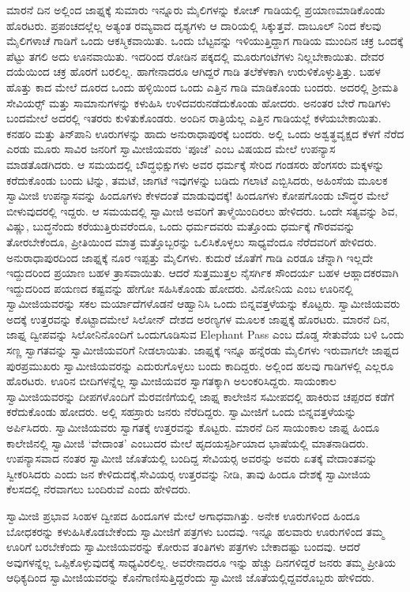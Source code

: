 \vskip 3pt

 ಮಾರನೆ ದಿನ ಅಲ್ಲಿಂದ ಜಾಫ್ನಕ್ಕೆ ಸುಮಾರು ಇನ್ನೂರು ಮೈಲಿಗಳನ್ನು ಕೋಚ್ ಗಾಡಿಯಲ್ಲಿ ಪ್ರಯಾಣಮಾಡಿಕೊಂಡು ಹೊರಟರು. ಪ್ರಪಂಚದಲ್ಲೆಲ್ಲ ಅತ್ಯಂತ ರಮ್ಯವಾದ ದೃಶ್ಯಗಳು ಆ ದಾರಿಯಲ್ಲಿ ಸಿಕ್ಕುತ್ತವೆ. ದಾಬೂಲ್ ನಿಂದ ಕೆಲವು ಮೈಲಿಗಳಾಚೆ ಗಾಡಿಗೆ ಒಂದು ಆಕಸ್ಮಿಕವಾಯಿತು. ಒಂದು ಬೆಟ್ಟವನ್ನು ಇಳಿಯುತ್ತಿದ್ದಾಗ ಗಾಡಿಯ ಮುಂದಿನ ಚಕ್ರ ಒಂದಕ್ಕೆ ಪೆಟ್ಟು ತಗಲಿ ಅದು ಊನವಾಯಿತು. ಇದರಿಂದ ರೋಡಿನ ಪಕ್ಕದಲ್ಲಿ ಮೂರುಗಂಟೆಗಳು ನಿಲ್ಲಬೇಕಾಯಿತು. ದೇವರ ದಯೆಯಿಂದ ಚಕ್ರ ಹೊರಗೆ ಬರಲಿಲ್ಲ. ಹಾಗೇನಾದರೂ ಆಗಿದ್ದರೆ ಗಾಡಿ ತಲೆಕೆಳಕಾಗಿ ಉರುಳಿಕೊಳ್ಳುತ್ತಿತ್ತು. ಬಹಳ ಹೊತ್ತು ಕಾದ ಮೇಲೆ ದೂರದ ಒಂದು ಹಳ್ಳಿಯಿಂದ ಒಂದು ಎತ್ತಿನ ಗಾಡಿ ಮಾಡಿಕೊಂಡು ಬಂದರು. ಅದರಲ್ಲಿ ಶ‍್ರೀಮತಿ ಸೇವಿಯರ್ಸ್‍‍ ಮತ್ತು ಸಾಮಾನುಗಳನ್ನು ಕಳುಹಿಸಿ ಉಳಿದವರು\break ನಡೆದುಕೊಂಡು ಹೋದರು. ಅನಂತರ ಬೇರೆ ಗಾಡಿಗಳು ಬಂದಮೇಲೆ ಅದರಲ್ಲಿ ಇತರರು ಕುಳಿತುಕೊಂಡರು. ಅಂದಿನ ರಾತ್ರಿಯೆಲ್ಲ ಎತ್ತಿನ ಗಾಡಿಯಲ್ಲೆ ಕಳೆಯಬೇಕಾಯಿತು. ಕನಹರಿ ಮತ್ತು ತಿನ್‍ಪಾನಿ ಊರುಗಳನ್ನು ಹಾದು ಅನುರಾಧಾಪುರಕ್ಕೆ ಬಂದರು. ಅಲ್ಲಿ ಒಂದು ಅಶ್ವತ್ಥವೃಕ್ಷದ ಕೆಳಗೆ ನೆರೆದ ಎರಡು ಮೂರು ಸಾವಿರ ಜನರಿಗೆ ಸ್ವಾಮೀಜಿಯವರು ‘ಪೂಜೆ’ ಎಂಬ ವಿಷಯದ ಮೇಲೆ ಉಪನ್ಯಾಸ ಮಾಡತೊಡಗಿದರು. ಆ ಸಮಯದಲ್ಲಿ ಬೌದ್ಧಭಿಕ್ಷುಗಳು ಅವರ ಧರ್ಮಕ್ಕೆ ಸೇರಿದ ಗಂಡಸರು ಹೆಂಗಸರು ಮಕ್ಕಳನ್ನು ಕರೆದುಕೊಂಡು ಬಂದು ಟಿನ್ನು, ತಮಟೆ, ಜಾಗಟೆ ಇವುಗಳನ್ನು ಬಡಿದು ಗಲಾಟೆ ಎಬ್ಬಿಸಿದರು, ಅಹಿಂಸೆಯ ಮೂಲಕ ಸ್ವಾಮೀಜಿ ಉಪನ್ಯಾಸವನ್ನು ಹಿಂದೂಗಳು ಕೇಳದಂತೆ ಮಾಡುವುದಕ್ಕೆ‌! ಹಿಂದೂಗಳು ಕೋಪಗೊಂಡು ಬೌದ್ಧರ ಮೇಲೆ ಬೀಳುವುದರಲ್ಲಿ ಇದ್ದರು. ಆ ಸಮಯದಲ್ಲಿ ಸ್ವಾಮೀಜಿ ಅವರಿಗೆ ತಾಳ್ಮೆಯಿಂದಿರಲು ಹೇಳಿದರು. ಒಂದೇ ಸತ್ಯವನ್ನು ಶಿವ, ವಿಷ್ಣು, ಬುದ್ಧನೆಂದು ಕರೆಯುತ್ತಿರುವರೆಂದೂ, ಒಂದು ಧರ್ಮದವರು ಮತ್ತೊಂದು ಧರ್ಮಕ್ಕೆ ಗೌರವವನ್ನು ತೋರಬೇಕೆಂದೂ, ಪ್ರೀತಿಯಿಂದ ಮಾತ್ರ ಮತ್ತೊಬ್ಬರನ್ನು ಒಲಿಸಿಕೊಳ್ಳಲು ಸಾಧ್ಯವೆಂದೂ ನೆರೆದವರಿಗೆ ಹೇಳಿದರು. ಅನುರಾಧಾಪುರದಿಂದ ಜಾಫ್ನಕ್ಕೆ ನೂರ ಇಪ್ಪತ್ತು ಮೈಲಿಗಳು. ಕುದುರೆ ಜೊತೆಗೆ ಗಾಡಿ ಎರಡೂ ಚೆನ್ನಾಗಿ ಇಲ್ಲದೇ ಇದ್ದುದರಿಂದ ಪ್ರಯಾಣ ಬಹಳ ತ್ರಾಸವಾಯಿತು. ಆದರೆ ಸುತ್ತಮುತ್ತಲ ನೈಸರ್ಗಿಕ ಸೌಂದರ್ಯ ಬಹಳ ಆಹ್ಲಾದಕರವಾಗಿ ಇದ್ದುದರಿಂದ ಪಯಣದ ಕಷ್ಟವನ್ನು ಹೇಗೋ ಸಹಿಸಿಕೊಂಡು ಹೋದರು. ವಿನೋನಿಯ ಎಂಬ ಊರಿನಲ್ಲಿ ಸ್ವಾಮೀಜಿಯವರನ್ನು ಸಕಲ ಮರ್ಯಾದೆಗಳೊಡನೆ ಆಹ್ವಾನಿಸಿ ಒಂದು ಬಿನ್ನವತ್ತಳೆಯನ್ನು ಕೊಟ್ಟರು. ಸ್ವಾಮೀಜಿಯವರು ಅದಕ್ಕೆ ಉತ್ತರವನ್ನು ಕೊಟ್ಟಾದಮೇಲೆ ಸಿಲೋನ್ ದೇಶದ ಅರಣ್ಯಗಳ ಮೂಲಕ ಜಾಫ್ನಕ್ಕೆ ಹೊರಟರು. ಮಾರನೆ ದಿನ, ಜಾಫ್ನ ದ್ವೀಪವನ್ನು ಸಿಲೋನಿನೊಂದಿಗೆ ಒಂದುಗೂಡಿಸುವ Elephant Pass ಎಂಬ ದೊಡ್ಡ ಸೇತುವೆಯ ಬಳಿ ಒಂದು ಸಣ್ಣ ಸ್ವಾಗತವನ್ನು ಸ್ವಾಮೀಜಿಯವರಿಗೆ ನೀಡಲಾಯಿತು. ಜಾಫ್ನಕ್ಕೆ ಇನ್ನೂ ಹನ್ನೆರಡು ಮೈಲಿಗಳು ಇರುವಾಗಲೇ ಜಾಫ್ನದ ಪುರಪ್ರಮುಖರು ಸ್ವಾಮೀಜಿಯವರನ್ನು ಎದುರುಗೊಳ್ಳಲು ಬಂದು ಕಾದಿದ್ದರು. ಅಲ್ಲಿಂದ ಹಲವು ಗಾಡಿಗಳಲ್ಲಿ ಎಲ್ಲರೂ ಹೊರಟರು. ಊರಿನ ಬೀದಿಗಳನ್ನೆಲ್ಲ ಸ್ವಾಮೀಜಿಯವರ ಸ್ವಾಗತಕ್ಕಾಗಿ ಅಲಂಕರಿಸಿದ್ದರು. ಸಾಯಂಕಾಲ ಸ್ವಾಮೀಜಿಯವರನ್ನು ದೀಪಗಳೊಂದಿಗೆ ಮೆರವಣಿಗೆಯಲ್ಲಿ ಜಾಫ್ನ ಕಾಲೇಜಿನ ಸಮೀಪದಲ್ಲಿ ಹಾಕಿರುವ ಚಪ್ಪರದ ಕಡೆಗೆ ಕರೆದುಕೊಂಡು ಹೋದರು. ಅಲ್ಲಿ ಸಹಸ್ರಾರು ಜನರು ನೆರೆದಿದ್ದರು. ಸ್ವಾಮೀಜಿಗೆ ಒಂದು ಬಿನ್ನವತ್ತಳೆಯನ್ನು ಅರ್ಪಿಸಿದರು. ಸ್ವಾಮೀಜಿಯವರು ಸ್ವಾಗತಕ್ಕೆ ಉತ್ತರವನ್ನು ಕೊಟ್ಟರು. ಮಾರನೆ ದಿನ ಸಾಯಂಕಾಲ ಜಾಫ್ನ ಹಿಂದೂ ಕಾಲೇಜಿನಲ್ಲಿ ಸ್ವಾಮೀಜಿ ‘ವೇದಾಂತ’ ಎಂಬುದರ ಮೇಲೆ ಹೃದಯಸ್ಪರ್ಶಿಯಾದ ಭಾಷೆಯಲ್ಲಿ ಮಾತನಾಡಿದರು. ಉಪನ್ಯಾಸವಾದ ನಂತರ ಸ್ವಾಮೀಜಿ ಜೊತೆಯಲ್ಲಿ ಬಂದಿದ್ದ ಸೇವಿಯರ‍್ಸ ಅವರನ್ನು ಅವರು ಏತಕ್ಕೆ ವೇದಾಂತವನ್ನು ಸ್ವೀಕರಿಸಿದರು ಎಂದು ಜನ ಕೇಳಿದುದಕ್ಕೆ,\break ಸೇವಿಯರ‍್ಸ ಉತ್ತರವನ್ನು ನೀಡಿ, ತಾವು ಹಿಂದೂ ದೇಶಕ್ಕೆ ಸ್ವಾಮೀಜಿಯ ಕೆಲಸದಲ್ಲಿ ನೆರವಾಗಲು ಬಂದಿರುವೆ ಎಂದು ಹೇಳಿದರು. 

 ಸ್ವಾಮೀಜಿ ಪ್ರಭಾವ ಸಿಂಹಳ ದ್ವೀಪದ ಹಿಂದೂಗಳ ಮೇಲೆ ಅಗಾಧವಾಗಿತ್ತು. ಅನೇಕ ಊರುಗಳಿಂದ ಹಿಂದೂ ಬೋಧಕರನ್ನು ಕಳುಹಿಸಿಕೊಡಬೇಕೆಂದು ಸ್ವಾಮೀಜಿಗೆ ಪತ್ರಗಳು ಬಂದವು. ಇನ್ನೂ ಹಲವಾರು ಊರುಗಳಿಂದ ತಮ್ಮ ಊರಿಗೆ ಬರಬೇಕೆಂದು ಸ್ವಾಮೀಜಿಯವರನ್ನು ಕೋರುವ ತಂತಿಗಳು ಪತ್ರಗಳು ಬೇಕಾದಷ್ಟು ಬಂದವು. ಆದರೆ ಅವುಗಳನ್ನೆಲ್ಲ ಒಪ್ಪಿಕೊಳ್ಳುವುದಕ್ಕೆ ಸಾಧ್ಯವಿರಲಿಲ್ಲ. ಅವರೇನಾದರೂ ಇನ್ನು ಹೆಚ್ಚು ದಿನಗಳಿದ್ದರೆ ಜನರು ತಮ್ಮ ಪ್ರೀತಿಯ ಆಧಿಕ್ಯದಿಂದ ಸ್ವಾಮೀಜಿಯವರನ್ನು ಕೊನೆಗಾಣಿಸುತ್ತಿದ್ದರೆಂದು ಸ್ವಾಮೀಜಿ ಜೊತೆಯಲ್ಲಿದ್ದವರೊಬ್ಬರು ಹೇಳಿದರು. 

